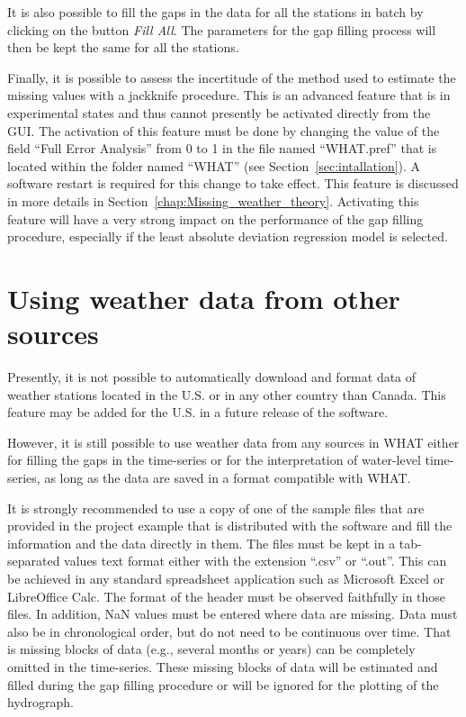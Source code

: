 \documentclass[WHATMANUAL.tex]{subfiles}
\begin{document}
It is also possible to fill the gaps in the data for all the stations in batch by clicking on the button \emph{Fill All}. The parameters for the gap filling process will then be kept the same for all the stations.

Finally, it is possible to assess the incertitude of the method used to estimate the missing values with a jackknife procedure. This is an advanced feature that is in experimental states and thus cannot presently be activated directly from the GUI. The activation of this feature must be done by changing the value of the field ``Full Error Analysis'' from 0 to 1 in the file named ``WHAT.pref'' that is located within the folder named ``WHAT'' (see Section~\ref{sec:intallation}). A software restart is required for this change to take effect. This feature is discussed in more details in Section~\ref{chap:Missing_weather_theory}. Activating this feature will have a very strong impact on the performance of the gap filling procedure, especially if the least absolute deviation regression model is selected.

\section{Using weather data from other sources}

Presently, it is not possible to automatically download and format data of weather stations located in the U.S. or in any other country than Canada. This feature may be added for the U.S. in a future release of the software.

However, it is still possible to use weather data from any sources in WHAT either for filling the gaps in the time-series or for the interpretation of water-level time-series, as long as the data are saved in a format compatible with WHAT.

It is strongly recommended to use a copy of one of the sample files that are provided in the project example that is distributed with the software and fill the information and the data directly in them. The files must be kept in a tab-separated values text format either with the extension ``.csv'' or ``.out''. This can be achieved in any standard spreadsheet application such as Microsoft Excel or LibreOffice Calc. The format of the header must be observed faithfully in those files. In addition, NaN values must be entered where data are missing. Data must also be in chronological order, but do not need to be continuous over time. That is missing blocks of data (e.g., several months or years) can be completely omitted in the time-series. These missing blocks of data will be estimated and filled during the gap filling procedure or will be ignored for the plotting of the hydrograph.
\end{document}
